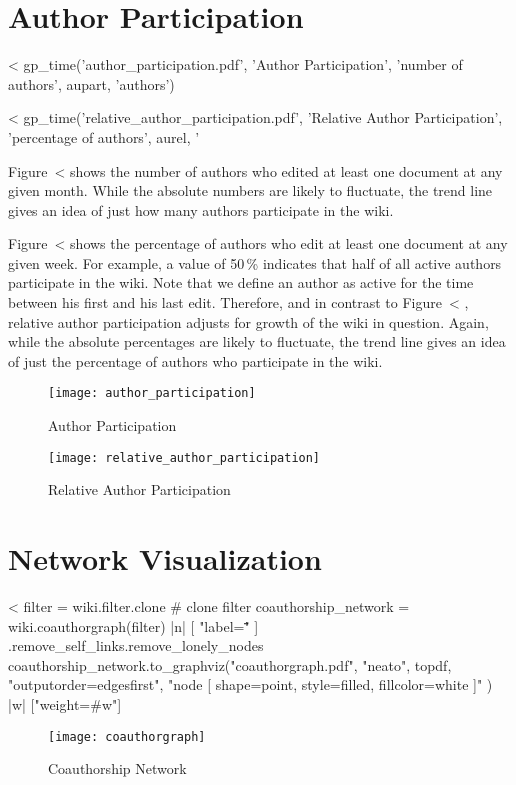 \documentclass{scrartcl}
\begin{document}

\section{Author Participation} %
\label{sec:author_participation}

<%
gp_time('author_participation.pdf', 
        'Author Participation', 'number of authors', 
        aupart, 'authors')

<%
gp_time('relative_author_participation.pdf', 
        'Relative Author Participation', 
        'percentage of authors', 
        aurel, '%

Figure~<%
shows the number of authors who edited at least one document at any given month. While the absolute numbers are likely to fluctuate, the trend line gives an idea of just how many authors participate in the wiki.

Figure~<%
shows the percentage of authors who edit at least one document at any given week. For example, a value of 50\,\% indicates that half of all active authors participate in the wiki. Note that we define an author as active for the time between his first and his last edit. Therefore, and in contrast to Figure~<%
, relative author participation adjusts for growth of the wiki in question. Again, while the absolute percentages are likely to fluctuate, the trend line gives an idea of just the percentage of authors who participate in the wiki.

\begin{figure}
  \texttt{[image: author\_participation]}
  \caption{Author Participation}
  \label{fig:author_participation}
  \vfill

  \texttt{[image: relative\_author\_participation]}
  \caption{Relative Author Participation}
  \label{fig:relative_author_participation}
\end{figure}


\section{Network Visualization} %
\label{sec:network_visualization}

<%
filter = wiki.filter.clone # clone filter
coauthorship_network = wiki.coauthorgraph(filter) { |n| [ "label=\"\"" ] }.remove_self_links.remove_lonely_nodes
coauthorship_network.to_graphviz("coauthorgraph.pdf", "neato", topdf, "outputorder=edgesfirst", "node [ shape=point, style=filled, fillcolor=white ]" ) { |w|  ["weight=#{w}"] }
\begin{figure}[htbp]
	\centering
	\texttt{[image: coauthorgraph]}
	\caption{Coauthorship Network}
	\label{fig:coauthorship_network}
\end{figure}
\end{document}
